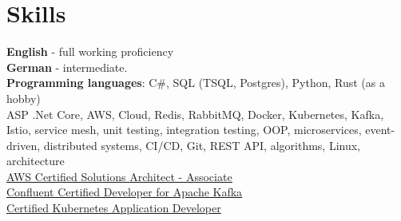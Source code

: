 \documentclass[letterpaper,11pt]{article}
\begin{document}
\section{Skills}
 \begin{itemize}[leftmargin=0.15in, label={}]
    \small{\item{
     \textbf{English}{ - full working proficiency} \\
     \textbf{German}{ - intermediate.} \\

     \textbf{Programming languages}{: C\#, SQL (TSQL, Postgres), Python, Rust (as a hobby)} \\
     ASP .Net Core, AWS, Cloud, Redis, RabbitMQ, Docker, Kubernetes, Kafka, Istio, service mesh,
     unit testing, integration testing, OOP, microservices, event-driven, distributed systems, CI/CD, Git, 
     REST API, algorithms, Linux, architecture \\
     \href{https://www.credly.com/earner/earned/badge/667372fc-1f37-4743-8fe2-60b88c371f6e}{\underline{AWS Certified Solutions Architect - Associate}} \\
     \href{https://www.credential.net/ca157eb4-f685-43ed-a368-1d3c0944dde1}{\underline{Confluent Certified Developer for Apache Kafka}} \\
     \href{https://www.credly.com/badges/3649b5ba-fcf4-4a2b-a32a-0c798421e6ba}{\underline{Certified Kubernetes Application Developer}}
    }}
 \end{itemize}
\end{document}
